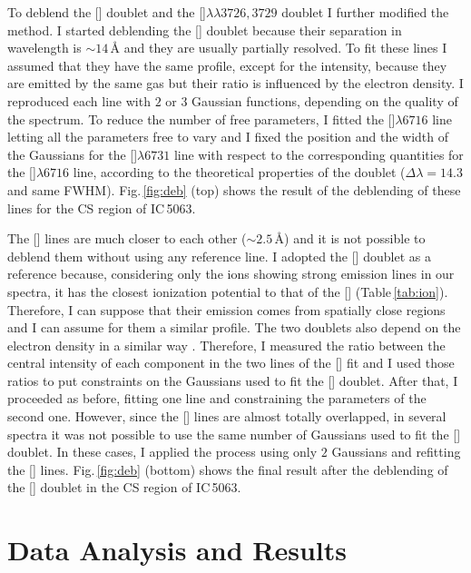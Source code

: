 \documentclass[../main.tex]{subfiles}
\begin{document}
To deblend the [] doublet and the []$\lambda\lambda3726,3729$ doublet I further modified the method.
I started deblending the [] doublet because their separation in wavelength is $\sim 14\,\si{\angstrom}$ and they are usually partially resolved.
To fit these lines I assumed that they have the same profile, except for the intensity, because they are emitted by the same gas but their ratio is influenced by the electron density.
I reproduced each line with $2$ or $3$ Gaussian functions, depending on the quality of the spectrum.
To reduce the number of free parameters, I fitted the []$\lambda6716$ line letting all the parameters free to vary and I fixed the position and the width of the Gaussians for the []$\lambda6731$ line with respect to the corresponding quantities for the []$\lambda6716$ line, according to the theoretical properties of the doublet ($\Delta \lambda = 14.3$ and same FWHM).
Fig.\,\ref{fig:deb} (top) shows the result of the deblending of these lines for the CS region of IC\,5063.

The [] lines are much closer to each other ($\sim 2.5$\,\AA) and it is not possible to deblend them without using any reference line.
I adopted the [] doublet as a reference because, considering only the ions showing strong emission lines in our spectra, it has the closest ionization potential to that of the [] (Table\,\ref{tab:ion}).
Therefore, I can suppose that their emission comes from spatially close regions and I can assume for them a similar profile.
The two doublets also depend on the electron density in a similar way \citep[see][]{OsterbrockAGN}.
Therefore, I measured the ratio between the central intensity of each component in the two lines of the [] fit and I used those ratios to put constraints on the Gaussians used to fit the [] doublet.
After that, I proceeded as before, fitting one line and constraining the parameters of the second one.
However, since the [] lines are almost totally overlapped, in several spectra it was not possible to use the same number of Gaussians used to fit the [] doublet.
In these cases, I applied the process using only $2$ Gaussians and refitting the [] lines.
Fig.\,\ref{fig:deb} (bottom) shows the final result after the deblending of the [] doublet in the CS region of IC\,5063.


\section{Data Analysis and Results}
\label{sec:data_an}
\end{document}
